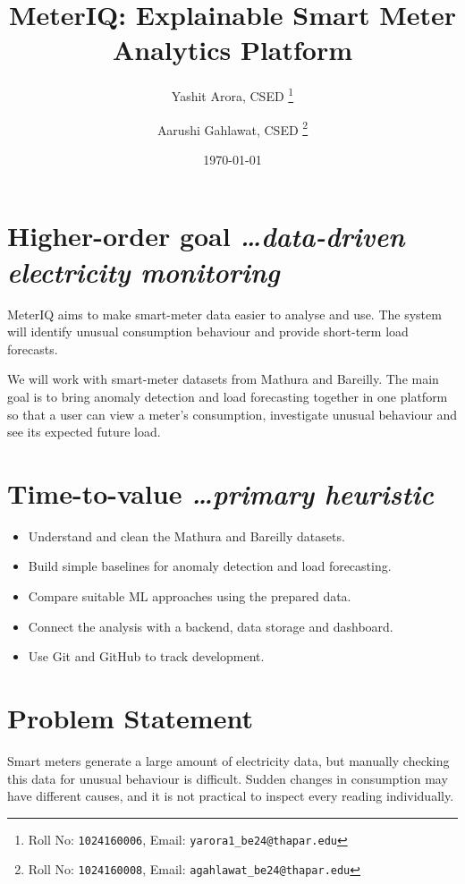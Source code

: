 \documentclass[11pt,a4paper]{article}
\title{MeterIQ: Explainable Smart Meter Analytics Platform}
\author{
  Yashit Arora, CSED%
  \thanks{Roll No: \texttt{1024160006}, Email: \texttt{yarora1\_be24@thapar.edu}}
  \and
  Aarushi Gahlawat, CSED%
  \thanks{Roll No: \texttt{1024160008}, Email: \texttt{agahlawat\_be24@thapar.edu}}
}
\date{\today}
\newcommand{\BvrHint}[1]{%
  {\normalfont\normalsize\itshape\hfill #1}}
\begin{document}
\maketitle

\section{Higher-order goal%
  \BvrHint{\ldots data-driven electricity monitoring}}

MeterIQ aims to make smart-meter data easier to analyse and use.
The system will identify unusual consumption behaviour and provide
short-term load forecasts.

We will work with smart-meter datasets from Mathura and Bareilly.
The main goal is to bring anomaly detection and load forecasting
together in one platform so that a user can view a meter's
consumption, investigate unusual behaviour and see its expected
future load.

\section{Time-to-value %
  \BvrHint{\ldots primary heuristic}}

\begin{itemize}[leftmargin=0.7cm]

    \item Understand and clean the Mathura and Bareilly datasets.

    \item Build simple baselines for anomaly detection and load
    forecasting.

    \item Compare suitable ML approaches using the prepared data.

    \item Connect the analysis with a backend, data storage and
    dashboard.

    \item Use Git and GitHub to track development.

\end{itemize}

\section{Problem Statement}

Smart meters generate a large amount of electricity data, but
manually checking this data for unusual behaviour is difficult.
Sudden changes in consumption may have different causes, and it is
not practical to inspect every reading individually.
\end{document}
